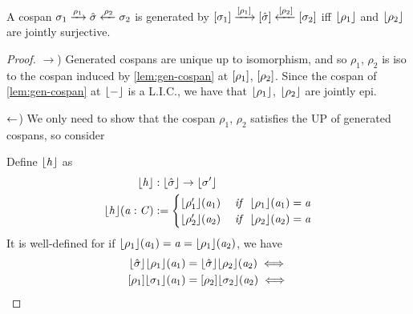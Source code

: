 \begin{lemma}\label{lem:gen-cospan-epi-prop}
    A cospan $\sigma_1 \xrightarrow{\rho_1} \hat\sigma \xleftarrow{\rho_2} \sigma_2$ is 
    generated by $[\sigma_1] \xrightarrow{[\rho_1]} [\hat\sigma] \xleftarrow{[\rho_2]} [\sigma_2]$ 
    iff $\lfloor\rho_1\rfloor$ and $\lfloor\rho_2\rfloor$ are jointly surjective.
\end{lemma}
\begin{proof}\nl
    $\to$) 
    Generated cospans are unique up to isomorphism, and so $\rho_1$, $\rho_2$ is iso to the cospan induced by \cref{lem:gen-cospan} at $[\rho_1]$, $[\rho_2]$. 
    Since the cospan of \cref{lem:gen-cospan} at $\lfloor-\rfloor$ is a L.I.C., we have that $\lfloor\rho_1\rfloor$, $\lfloor\rho_2\rfloor$ are jointly epi.

    $\leftarrow$)
    We only need to show that the cospan $\rho_1$, $\rho_2$ satisfies the UP of generated cospans, so consider
    \begin{center}
    \end{center}
    Define $\lfloor\mathit{h}\rfloor$ as 
    \begin{align*}
        \lfloor\mathit{h}\rfloor & : \lfloor\hat\sigma\rfloor \to \lfloor\sigma'\rfloor \\
        \lfloor\mathit{h}\rfloor(\mathit{a} : \mathit{C}) & := \begin{cases} \lfloor\rho_1'\rfloor(\mathit{a}_1)  & \;\mathit{if}\;\; \lfloor\rho_1\rfloor(\mathit{a}_1) = \mathit{a} \\
                                                    \lfloor\rho_2'\rfloor(\mathit{a}_2)  & \;\mathit{if}\;\; \lfloor\rho_2\rfloor(\mathit{a}_2) = \mathit{a}
                                      \end{cases}
    \end{align*}
    It is well-defined for if $\lfloor\rho_1\rfloor(\mathit{a}_1) = \mathit{a} = \lfloor\rho_1\rfloor(\mathit{a}_2)$, we have
    \begin{align*}
        \concL{\hat\sigma}\concL{\rho_1}(\va_1) &= \concL{\hat\sigma}\concL{\rho_2}(\va_2) \iff \\
        \anyL{\rho_1}\concL{\sigma_1}(\va_1) &= \anyL{\rho_2}\concL{\sigma_2}(\va_2) \iff \\

\end{align*}
\end{proof}

